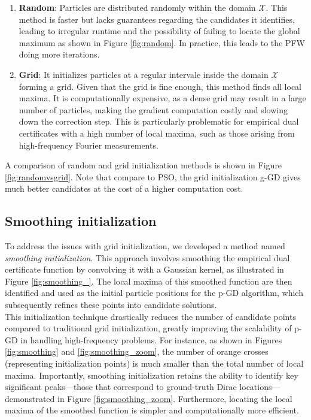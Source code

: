 \documentclass[a4paper,12pt,oneside]{report}
\theoremstyle{named}
\begin{document}
\begin{enumerate}
    \item \textbf{Random}: Particles are distributed randomly within the domain $\mathcal{X}$. This method is faster but lacks guarantees regarding the candidates it identifies, leading to irregular runtime and the possibility of failing to locate the global maximum as shown in Figure \ref{fig:random}. In practice, this leads to the PFW doing more iterations.
    \item  \textbf{Grid}: It initializes particles at a regular intervale inside the domain $\mathcal{X}$ forming a grid. Given that the grid is fine enough, this method finds all local maxima. It is computationally expensive, as a dense grid may result in a large number of particles, making the gradient computation costly and slowing down the correction step. This is particularly problematic for empirical dual certificates with a high number of local maxima, such as those arising from high-frequency Fourier measurements.
\end{enumerate}

A comparison of random and grid initialization methods is shown in Figure \ref{fig:randomvsgrid}. Note that compare to PSO, the grid initialization g-GD gives much better candidates at the cost of a higher computation cost. 

\subsection{Smoothing initialization}
To address the issues with grid initialization, we developed a method named \textit{smoothing initialization}. This approach involves smoothing the empirical dual certificate function by convolving it with a Gaussian kernel, as illustrated in Figure \ref{fig:smoothing_}. The local maxima of this smoothed function are then identified and used as the initial particle positions for the p-GD algorithm, which subsequently refines these points into candidate solutions. \\

This initialization technique drastically reduces the number of candidate points compared to traditional grid initialization, greatly improving the scalability of p-GD in handling high-frequency problems. For instance, as shown in Figures \ref{fig:smoothing} and \ref{fig:smoothing_zoom}, the number of orange crosses (representing initialization points) is much smaller than the total number of local maxima. Importantly, smoothing initialization retains the ability to identify key significant peaks—those that correspond to ground-truth Dirac locations—demonstrated in Figure \ref{fig:smoothing_zoom}. Furthermore, locating the local maxima of the smoothed function is simpler and computationally more efficient.
\end{document}
